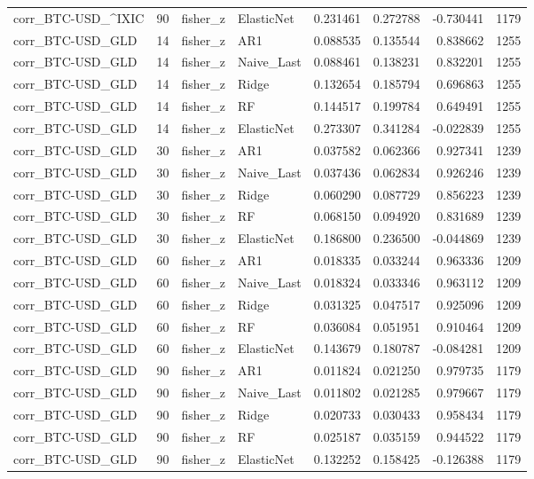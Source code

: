 \begin{table}
\begin{tabular}{lrllrrrr}
corr_BTC-USD_^IXIC & 90 & fisher_z & ElasticNet & 0.231461 & 0.272788 & -0.730441 & 1179 \\
corr_BTC-USD_GLD & 14 & fisher_z & AR1 & 0.088535 & 0.135544 & 0.838662 & 1255 \\
corr_BTC-USD_GLD & 14 & fisher_z & Naive_Last & 0.088461 & 0.138231 & 0.832201 & 1255 \\
corr_BTC-USD_GLD & 14 & fisher_z & Ridge & 0.132654 & 0.185794 & 0.696863 & 1255 \\
corr_BTC-USD_GLD & 14 & fisher_z & RF & 0.144517 & 0.199784 & 0.649491 & 1255 \\
corr_BTC-USD_GLD & 14 & fisher_z & ElasticNet & 0.273307 & 0.341284 & -0.022839 & 1255 \\
corr_BTC-USD_GLD & 30 & fisher_z & AR1 & 0.037582 & 0.062366 & 0.927341 & 1239 \\
corr_BTC-USD_GLD & 30 & fisher_z & Naive_Last & 0.037436 & 0.062834 & 0.926246 & 1239 \\
corr_BTC-USD_GLD & 30 & fisher_z & Ridge & 0.060290 & 0.087729 & 0.856223 & 1239 \\
corr_BTC-USD_GLD & 30 & fisher_z & RF & 0.068150 & 0.094920 & 0.831689 & 1239 \\
corr_BTC-USD_GLD & 30 & fisher_z & ElasticNet & 0.186800 & 0.236500 & -0.044869 & 1239 \\
corr_BTC-USD_GLD & 60 & fisher_z & AR1 & 0.018335 & 0.033244 & 0.963336 & 1209 \\
corr_BTC-USD_GLD & 60 & fisher_z & Naive_Last & 0.018324 & 0.033346 & 0.963112 & 1209 \\
corr_BTC-USD_GLD & 60 & fisher_z & Ridge & 0.031325 & 0.047517 & 0.925096 & 1209 \\
corr_BTC-USD_GLD & 60 & fisher_z & RF & 0.036084 & 0.051951 & 0.910464 & 1209 \\
corr_BTC-USD_GLD & 60 & fisher_z & ElasticNet & 0.143679 & 0.180787 & -0.084281 & 1209 \\
corr_BTC-USD_GLD & 90 & fisher_z & AR1 & 0.011824 & 0.021250 & 0.979735 & 1179 \\
corr_BTC-USD_GLD & 90 & fisher_z & Naive_Last & 0.011802 & 0.021285 & 0.979667 & 1179 \\
corr_BTC-USD_GLD & 90 & fisher_z & Ridge & 0.020733 & 0.030433 & 0.958434 & 1179 \\
corr_BTC-USD_GLD & 90 & fisher_z & RF & 0.025187 & 0.035159 & 0.944522 & 1179 \\
corr_BTC-USD_GLD & 90 & fisher_z & ElasticNet & 0.132252 & 0.158425 & -0.126388 & 1179 \\

\end{tabular}
\end{table}
